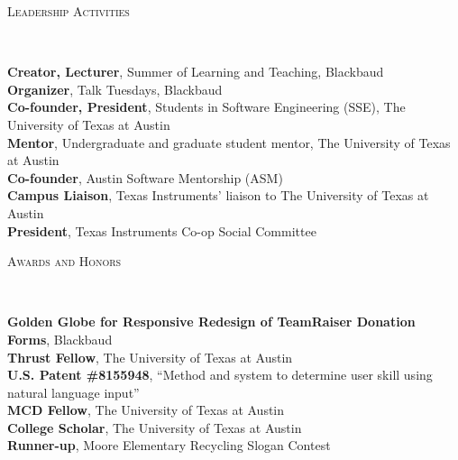 \documentclass[9pt]{article}
\newenvironment{changemargin}[2]{%
  \begin{list}{}{%
    \setlength{\topsep}{0pt}%
    \setlength{\leftmargin}{#1}%
    \setlength{\rightmargin}{#2}%
    \setlength{\listparindent}{\parindent}%
    \setlength{\itemindent}{\parindent}%
    \setlength{\parsep}{\parskip}%
  }%
  \item[]}{\end{list}
}
\newcommand{\lineover}{
	\begin{changemargin}{-0.05in}{-0.05in}
		\vspace*{-8pt}
		\hrulefill \\
		\vspace*{-2pt}
	\end{changemargin}
}
\newcommand{\header}[1]{
	\begin{changemargin}{-0.5in}{-0.5in}
		\scshape{#1}\\
  	\lineover
	\end{changemargin}
}
\newenvironment{body} {
	\vspace*{-16pt}
	\begin{changemargin}{-0.25in}{-0.5in}
  }	
	{\end{changemargin}
}
\begin{document}
\medskip


\header{Leadership Activities}

\begin{body}
	\vspace{14pt}
	\textbf{Creator, Lecturer}, Summer of Learning and Teaching, Blackbaud\\
	\medskip
	\textbf{Organizer}, Talk Tuesdays, Blackbaud\\
	\medskip
	\textbf{Co-founder, President}, Students in Software Engineering (SSE), The University of Texas at Austin\\
	\medskip
	\textbf{Mentor}, Undergraduate and graduate student mentor, The University of Texas at Austin\\
	\medskip
	\textbf{Co-founder}, Austin Software Mentorship (ASM)\\
	\medskip
	\textbf{Campus Liaison}, Texas Instruments' liaison to The University of Texas at Austin\\
	\medskip
	\textbf{President}, Texas Instruments Co-op Social Committee\\
\end{body}

\medskip


\header{Awards and Honors}

\begin{body}
	\vspace{14pt}
	\textbf{Golden Globe for Responsive Redesign of TeamRaiser Donation Forms}, Blackbaud\\
	\medskip
	\textbf{Thrust Fellow}, The University of Texas at Austin\\
	\medskip
	\textbf{U.S. Patent \#8155948}, ``Method and system to determine user skill using natural language input''\\
	\medskip
	\textbf{MCD Fellow}, The University of Texas at Austin\\
	\medskip
	\textbf{College Scholar}, The University of Texas at Austin\\
	\medskip
	\textbf{Runner-up}, Moore Elementary Recycling Slogan Contest\\
\end{body}
\end{document}
